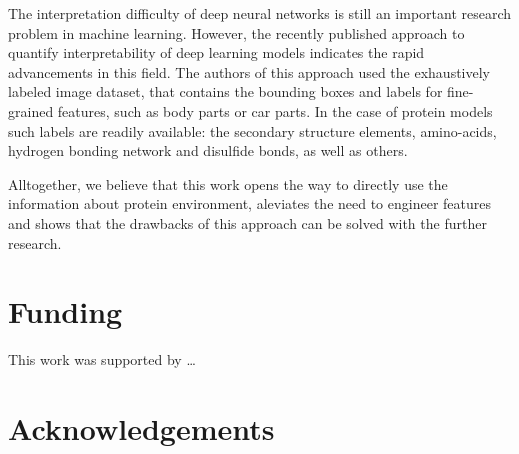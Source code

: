 \documentclass{bioinfo}
\begin{document}
The interpretation difficulty of deep neural networks is still an important research problem in machine learning. However, the recently 
published approach to quantify interpretability \citep{bau2017network} of deep learning models indicates the rapid advancements in this field. 
The authors of this approach used the exhaustively labeled image dataset, that contains the bounding boxes and labels for 
fine-grained features, such as body parts or car parts. In the case of protein models such labels are readily available: 
the secondary structure elements, amino-acids, hydrogen bonding network and disulfide bonds, as well as others.

Alltogether, we believe that this work opens the way to directly use the information about protein environment, aleviates the need to 
engineer features and shows that the drawbacks of this approach can be solved with the further research. 

\section*{Funding}
This work was supported by \dots

\section*{Acknowledgements}



\end{document}
